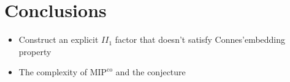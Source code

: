 \section*{Conclusions}

\begin{itemize}

    \item Construct an explicit $II_1$ factor that doesn't satisfy Connes'embedding property
    \item The complexity of $\text{MIP}^\text{co}$ and the conjecture
    
\end{itemize}
